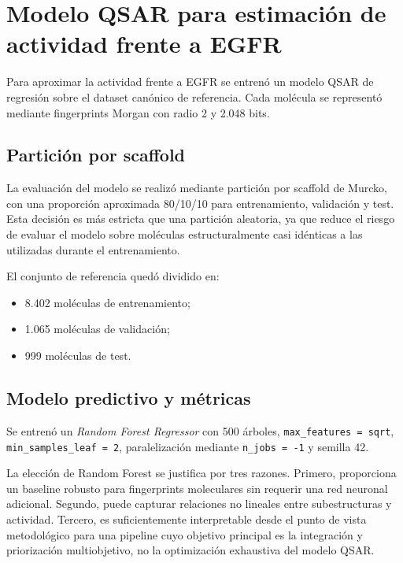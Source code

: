 \documentclass[IB]{TFUOC}%
\begin{document}
\section{Modelo QSAR para estimación de actividad frente a EGFR}

Para aproximar la actividad frente a EGFR se entrenó un modelo QSAR de regresión sobre el dataset canónico de referencia. Cada molécula se representó mediante fingerprints Morgan con radio 2 y 2.048 bits.

\subsection{Partición por scaffold}

La evaluación del modelo se realizó mediante partición por scaffold de Murcko, con una proporción aproximada 80/10/10 para entrenamiento, validación y test. Esta decisión es más estricta que una partición aleatoria, ya que reduce el riesgo de evaluar el modelo sobre moléculas estructuralmente casi idénticas a las utilizadas durante el entrenamiento.

El conjunto de referencia quedó dividido en:

\begin{itemize}
    \item 8.402 moléculas de entrenamiento;
    \item 1.065 moléculas de validación;
    \item 999 moléculas de test.
\end{itemize}

\subsection{Modelo predictivo y métricas}

Se entrenó un \textit{Random Forest Regressor} con 500 árboles, \texttt{max\_features = sqrt}, \texttt{min\_samples\_leaf = 2}, paralelización mediante \texttt{n\_jobs = -1} y semilla 42.

La elección de Random Forest se justifica por tres razones. Primero, proporciona un baseline robusto para fingerprints moleculares sin requerir una red neuronal adicional. Segundo, puede capturar relaciones no lineales entre subestructuras y actividad. Tercero, es suficientemente interpretable desde el punto de vista metodológico para una pipeline cuyo objetivo principal es la integración y priorización multiobjetivo, no la optimización exhaustiva del modelo QSAR.
\end{document}
